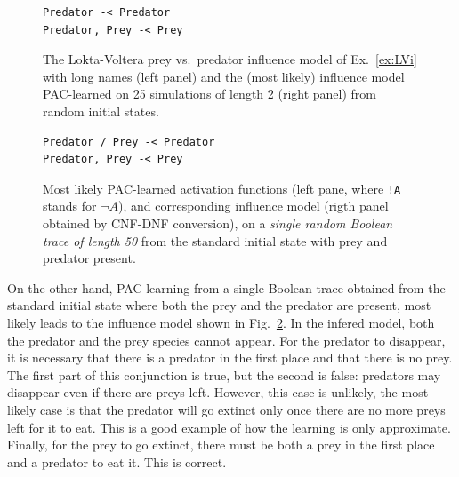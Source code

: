 \documentclass{llncs}
\begin{document}
\begin{figure}[htb]
   \begin{minipage}{.5\textwidth}
	
   \end{minipage}%
   \hspace{.04\textwidth}%
   \begin{minipage}{.45\textwidth}
      \begin{lstlisting}[frame=single]
Predator -< Predator
Predator, Prey -< Prey
      \end{lstlisting}
   \end{minipage}
   \caption{The Lokta-Voltera prey vs.\ predator influence model of Ex.~\ref{ex:LVi}
   with long names (left panel) and the (most likely) influence model PAC-learned on 25 simulations of length 2 (right panel) from random initial states.\label{bool-LV}}
\end{figure}



\begin{figure}[htb]
   \begin{minipage}{.5\textwidth}
      
   \end{minipage}%
   \hspace{.04\textwidth}%
   \begin{minipage}{.45\textwidth}
      \begin{lstlisting}[frame=single]
Predator / Prey -< Predator
Predator, Prey -< Prey
      \end{lstlisting}
   \end{minipage}
   \caption{Most likely PAC-learned activation functions (left pane, where \texttt{!A} stands for $\neg A$), and corresponding influence model (rigth panel obtained by CNF-DNF conversion), on a \emph{single random Boolean trace of length 50} from the standard initial state with prey and predator present.}\label{bool-LV.res}
\end{figure}

On the other hand, PAC learning from a single Boolean trace obtained from the standard initial state where both the prey and the predator are present,
most likely leads to the influence model shown in Fig.~\ref{bool-LV.res}.
In the infered model, both the predator and the prey species cannot appear. 
For the predator to disappear, it is necessary that there is a predator in the first place and that there is no prey. 
The first part of this conjunction is true, but the second is false: predators may disappear even if there are preys left.
However, this case is unlikely, the most likely case is that the predator will go extinct only once there are no more preys left for it to eat. This is a good example of how the learning is only approximate.
%
Finally, for the prey to go extinct, there must be both a prey in the first place and a predator to eat it. This is correct.
\end{document}
